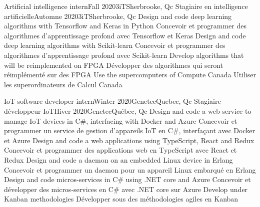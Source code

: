 \documentclass[letterpaper,11pt]{resume}
\begin{document}
    \resumeSubheadingEnFr
        {Artificial intelligence intern}{Fall 2020}{3iT}{Sherbrooke, Qc}
        {Stagiaire en intelligence artificielle}{Automne 2020}{3iT}{Sherbrooke, Qc}
        \resumeItemListStart
            \resumeItemEnFr
                {Design and code deep learning algorithms with Tensorflow and Keras in Python}
                {Concevoir et programmer des algorithmes d'apprentissage profond avec Tensorflow et Keras}
            \resumeItemEnFr
                {Design and code deep learning algorithms with Scikit-learn}
                {Concevoir et programmer des algorithmes d'apprentissage profond avec Scikit-learn}
            \resumeItemEnFr
                {Develop algorithms that will be reimplemented on FPGA}
                {Développer des algorithmes qui seront réimplémenté sur des FPGA}
            \resumeItemEnFr
                {Use the supercomputers of Compute Canada}
                {Utiliser les superordinateurs de Calcul Canada}
        \resumeItemListEnd
        
    \resumeSubheadingEnFr
        {IoT software developer intern}{Winter 2020}{Genetec}{Quebec, Qc}
        {Stagiaire développeur IoT}{Hiver 2020}{Genetec}{Québec, Qc}
        \resumeItemListStart
            \resumeItemEnFr
                {Design and code a web service to manage IoT devices in C\#, interfacing with Docker and Azure}
                {Concevoir et programmer un service de gestion d'appareils IoT en C\#, interfaçant avec Docker et Azure}
            \resumeItemEnFr
                {Design and code a web applications using TypeScript, React and Redux}
                {Concevoir et programmer des applications web en TypeScript avec React et Redux}
            \resumeItemEnFr
                {Design and code a daemon on an embedded Linux device in Erlang}
                {Concevoir et programmer un \«daemon\» pour un appareil Linux embarqué en Erlang}
            \resumeItemEnFr
                {Design and code micros-services in C\# using .NET core and Azure}
                {Concevoir et développer des micros-services en C\# avec .NET core sur Azure}
            \resumeItemEnFr
                {Develop under Kanban methodologies}
                {Développer sous des méthodologies agiles en Kanban}
        \resumeItemListEnd
\end{document}
